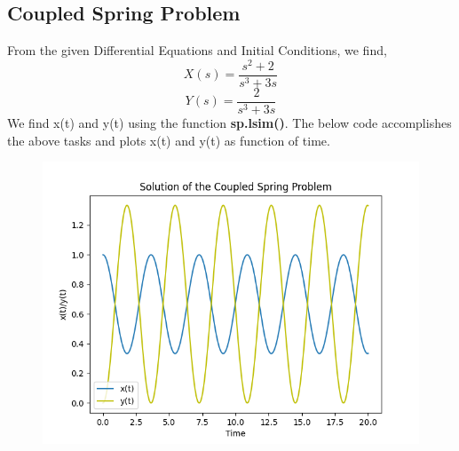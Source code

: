 \documentclass[12pt, a4paper]{report}
\begin{document}
\subsection{Coupled Spring Problem}
From the given Differential Equations and Initial Conditions, we find,
\begin{equation}
X(s) = \frac{s^2+2}{s^3+3s}
\end{equation}
\begin{equation}
Y(s) = \frac{2}{s^3+3s}
\end{equation}
We find x(t) and y(t) using the function \textbf{sp.lsim()}. The below code accomplishes the above tasks and plots x(t) and y(t) as function of time.
\noindent

\begin{figure}[h!]
    \centering
    \includegraphics[scale=0.75]{fig4.png} 
    \caption{}
    \label{fig:my_label}
\end{figure}
\end{document}
